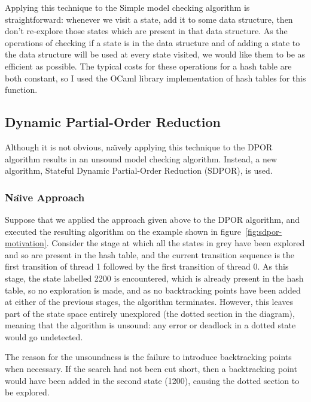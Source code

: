 \documentclass[12pt,a4paper,twoside,openright]{report}
\begin{document}
Applying this technique to the Simple model
checking algorithm is straightforward: whenever
we visit a state, add it to some data structure,
then don't re-explore those states which are
present in that data structure. As the operations
of checking if a state is in the data structure
and of adding a state to the data structure will
be used at every state visited, we would like them
to be as efficient as possible. The typical costs
for these operations for a hash table are both
constant, so I used the OCaml library implementation
of hash tables for this function.

\subsection{Dynamic Partial-Order Reduction}
Although it is not obvious, na\"{\i}vely
applying this technique to the DPOR
algorithm results in an
unsound model checking algorithm. Instead,
a new algorithm, Stateful Dynamic
Partial-Order Reduction (SDPOR), is used.

\subsubsection{Na\"{\i}ve Approach}

Suppose that we applied the approach
given above to the DPOR algorithm,
and executed the resulting algorithm
on the example shown in
figure~\ref{fig:sdpor-motivation}.
Consider the stage at which
all the states in grey have been
explored and so are present in the hash table,
and the current transition sequence is the first
transition of thread 1 followed by the first
transition of thread 0. As this stage, the state
labelled 2200 is encountered, which is already
present in the hash table, so no exploration is
made, and as no backtracking points have been added
at either of the previous stages, the algorithm
terminates. However, this leaves part of the state
space entirely unexplored (the dotted section in
the diagram), meaning that the algorithm is unsound:
any error or deadlock in a dotted state would go
undetected.

The reason for the unsoundness is the failure to
introduce backtracking points when necessary. If the
search had not been cut short, then a backtracking point
would have been added in the second state (1200), causing the
dotted section to be explored.
\end{document}
